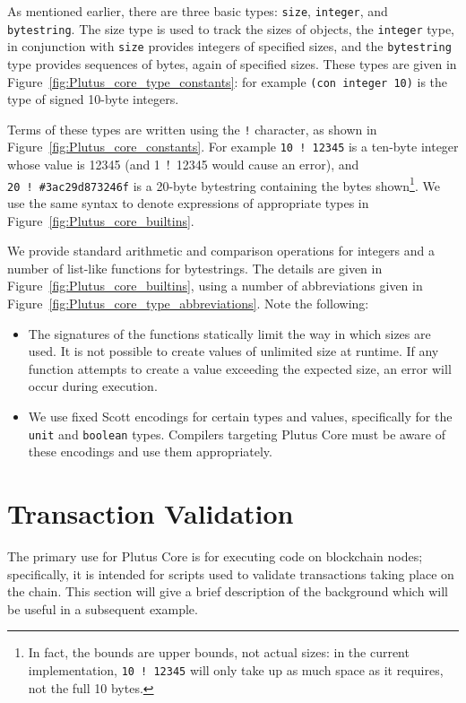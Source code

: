 \documentclass[a4paper]{article}
\begin{document}
As mentioned earlier, there are three basic types: \texttt{size},
\texttt{integer}, and \texttt{bytestring}.  The \textrm{size} type is
used to track the sizes of objects, the \texttt{integer} type, in
conjunction with \texttt{size} provides integers of specified sizes,
and the \texttt{bytestring} type provides sequences of bytes, again of
specified sizes.  These types are given in
Figure~\ref{fig:Plutus_core_type_constants}:  for example 
\texttt{(con integer 10)} is the type of signed 10-byte integers.


Terms of these types are written using the \texttt{!} character, as
shown in Figure~\ref{fig:Plutus_core_constants}.  For example
\texttt{10~!~12345} is a ten-byte integer whose value is 12345 (and
\textrm{1~!~12345} would cause an error), and \texttt{20~!~\#3ac29d873246f} 
is a 20-byte bytestring containing the bytes
shown\footnote{In fact, the bounds are upper bounds, not actual sizes:
  in the current implementation, \texttt{10~!~12345} will only take up
  as much space as it requires, not the full 10 bytes.}.  We use the
same syntax to denote expressions of appropriate types in
Figure~\ref{fig:Plutus_core_builtins}.

We provide standard arithmetic and comparison operations for integers
and a number of list-like functions for bytestrings. The details are
given in Figure~\ref{fig:Plutus_core_builtins}, using a number of
abbreviations given in Figure~\ref{fig:Plutus_core_type_abbreviations}.
Note the following:
\begin{itemize}
\item The signatures of the functions statically limit the way in
  which sizes are used.  It is not possible to create values of
  unlimited size at runtime.  If any function attempts to create a
  value exceeding the expected size, an error will occur during execution.
\item We use fixed Scott encodings for certain types and values,
  specifically for the \texttt{unit} and \texttt{boolean} types.
Compilers targeting Plutus Core must be aware of these encodings and
use them appropriately.
\end{itemize}

\newpage



\section{Transaction Validation}
The primary use for Plutus Core is for executing code on blockchain
nodes; specifically, it is intended for scripts used to validate
transactions taking place on the chain.  This section will give a
brief description of the background which will be useful in a
subsequent example.
\end{document}
